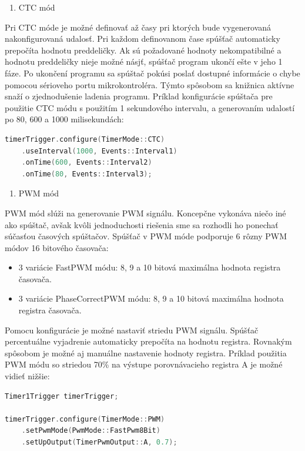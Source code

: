 \begin{enumerate}[resume]
    \item CTC mód
\end{enumerate}

Pri CTC móde je možné definovať až časy pri ktorých bude vygenerovaná nakonfigurovaná udalosť. Pri každom definovanom čase spúšťač automaticky prepočíta
hodnotu preddeličky. Ak sú požadované hodnoty nekompatibilné a hodnotu preddeličky nieje možné násjť, spúšťač program ukončí ešte v jeho 1 fáze. Po ukončení programu
sa spúštač pokúsi poslať dostupné informácie o chybe pomocou sérioveho portu mikrokontroléra. Týmto spôsobom sa knižnica aktívne snaží o zjednodušenie ladenia programu.
Príklad konfigurácie spúštača pre použitie CTC módu s použitím 1 sekundového intervalu, a generovaním udalostí po 80, 600 a 1000 milisekundách:
\begin{lstlisting}[language=c++]      
timerTrigger.configure(TimerMode::CTC)
    .useInterval(1000, Events::Interval1)
    .onTime(600, Events::Interval2)
    .onTime(80, Events::Interval3);
\end{lstlisting}

\begin{enumerate}[resume]
    \item PWM mód
\end{enumerate}

PWM mód slúži na generovanie PWM signálu. Koncepčne vykonáva niečo iné ako spúštač, avšak kvôli jednoduchosti riešenia sme sa rozhodli ho ponechať súčasťou časových
spúštačov. Spúšťač v PWM móde podporuje 6 rôzny PWM módov 16 bitového časovača:
\begin{itemize}
    \item 3 variácie FastPWM módu: 8, 9 a 10 bitová maximálna hodnota registra časovača.
    \item 3 variácie PhaseCorrectPWM módu: 8, 9 a 10 bitová maximálna hodnota registra časovača.
\end{itemize}

Pomocu konfigurácie je možné nastaviť striedu PWM signálu. Spúšťač percentuálne vyjadrenie automaticky prepočíta na hodnotu registra. Rovnakým spôsobom je možné
aj manuálne nastavenie hodnoty registra. Príklad použitia PWM módu so striedou 70\% na  výstupe porovnávacieho registra A je možné vidieť nižšie:

\begin{lstlisting}[language=c++]      
Timer1Trigger timerTrigger;

timerTrigger.configure(TimerMode::PWM)
    .setPwmMode(PwmMode::FastPwm8Bit)
    .setUpOutput(TimerPwmOutput::A, 0.7);
\end{lstlisting}


